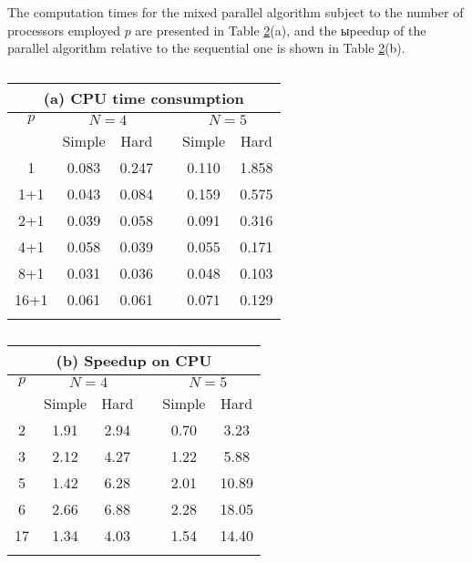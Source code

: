 \documentclass{aip-cp}
\begin{document}
The computation times for the mixed parallel algorithm subject to the number of processors employed $p$ are presented in Table \ref{tab:parallelResults}(a), and the ыpeedup of the parallel algorithm relative to the sequential one is shown in Table \ref{tab:parallelResults}(b). 

\begin{table}[h]
	\caption{}
	\label{tab:parallelResults}
	\begin{minipage}{0.49\linewidth}
	\begin{tabular}{cccccc}
		\multicolumn{6}{c}{(a) CPU time consumption }\\
		\hline\noalign{\smallskip}
		$p$ & \multicolumn{2}{c}{ $N=4$ } & & \multicolumn{2}{c}{$N=5$} \\
		\noalign{\smallskip} \cline{2-3} \cline{5-6} \noalign{\smallskip}
		 & Simple & Hard & & Simple & Hard  \\
		\noalign{\smallskip} \hline \noalign{\smallskip}
1    &  0.083 & 0.247 & & 0.110 & 1.858 \\
1+1  &  0.043 & 0.084 & & 0.159 & 0.575 \\
2+1  &  0.039 & 0.058 & & 0.091 & 0.316 \\
4+1	 &  0.058 & 0.039 & & 0.055 & 0.171 \\
8+1  &  0.031 & 0.036 & & 0.048 & 0.103 \\
16+1 &  0.061 & 0.061 & & 0.071 & 0.129 \\
		\noalign{\smallskip}\hline
	\end{tabular} 
	\end{minipage}

	\begin{minipage}{0.49\linewidth}
	\begin{tabular}{cccccc}
		\multicolumn{6}{c}{(b) Speedup on CPU}\\
		\hline\noalign{\smallskip}
		$p$ & \multicolumn{2}{c}{ $N=4$ } & & \multicolumn{2}{c}{$N=5$} \\
		\noalign{\smallskip} \cline{2-3} \cline{5-6} \noalign{\smallskip}
		 & Simple & Hard & & Simple & Hard  \\
		\noalign{\smallskip} \hline \noalign{\smallskip}
2  &  1.91 & 2.94 & & 0.70 &  3.23 \\
3  &  2.12 & 4.27 & & 1.22 &  5.88 \\
5  &  1.42 & 6.28 & & 2.01 & 10.89 \\
6  &  2.66 & 6.88 & & 2.28 & 18.05 \\
17 &  1.34 & 4.03 & & 1.54 & 14.40 \\
		\noalign{\smallskip}\hline
	\end{tabular}
	\end{minipage}
\end{table}
\end{document}
